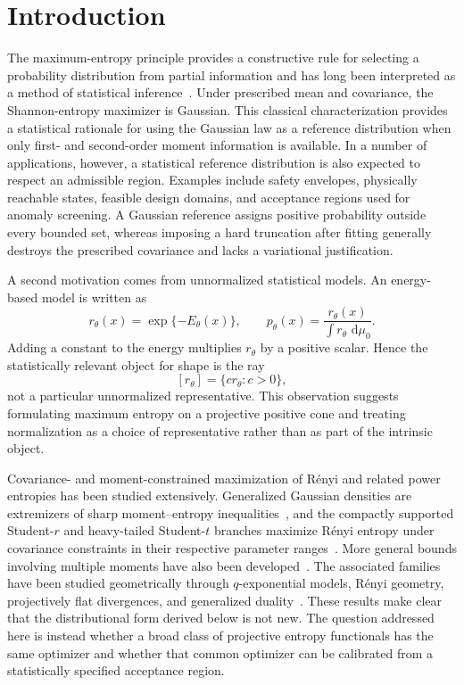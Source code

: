 \documentclass[pdflatex,sn-mathphys-num]{sn-jnl}
\theoremstyle{thmstyleone}
\theoremstyle{thmstyletwo}
\theoremstyle{thmstylethree}
\newcommand{\dd}{\,\mathrm{d}}
\begin{document}
\section{Introduction}\label{sec:introduction}

The maximum-entropy principle provides a constructive rule for selecting a probability distribution from partial information and has long been interpreted as a method of statistical inference~\citep{Jaynes1957}. Under prescribed mean and covariance, the Shannon-entropy maximizer is Gaussian. This classical characterization provides a statistical rationale for using the Gaussian law as a reference distribution when only first- and second-order moment information is available. In a number of applications, however, a statistical reference distribution is also expected to respect an admissible region. Examples include safety envelopes, physically reachable states, feasible design domains, and acceptance regions used for anomaly screening. A Gaussian reference assigns positive probability outside every bounded set, whereas imposing a hard truncation after fitting generally destroys the prescribed covariance and lacks a variational justification.

A second motivation comes from unnormalized statistical models. An energy-based model is written as
\[
 r_\theta(x)=\exp\{-E_\theta(x)\},
 \qquad
 p_\theta(x)=\frac{r_\theta(x)}{\int r_\theta\,\dd\mu_0}.
\]
Adding a constant to the energy multiplies $r_\theta$ by a positive scalar. Hence the statistically relevant object for shape is the ray
\[
 [r_\theta]=\{c r_\theta:c>0\},
\]
not a particular unnormalized representative. This observation suggests formulating maximum entropy on a projective positive cone and treating normalization as a choice of representative rather than as part of the intrinsic object.

Covariance- and moment-constrained maximization of R\'enyi and related power entropies has been studied extensively. Generalized Gaussian densities are extremizers of sharp moment--entropy inequalities~\citep{LutwakYangZhang2005}, and the compactly supported Student-$r$ and heavy-tailed Student-$t$ branches maximize R\'enyi entropy under covariance constraints in their respective parameter ranges~\citep{JohnsonVignat2007}. More general bounds involving multiple moments have also been developed~\citep{Reeves2020}. The associated families have been studied geometrically through $q$-exponential models, R\'enyi geometry, projectively flat divergences, and generalized duality~\citep{AmariOhara2011,Wong2018,WongZhang2022,doi:10.1142/9789811296710_0013}. These results make clear that the distributional form derived below is not new. The question addressed here is instead whether a broad class of projective entropy functionals has the same optimizer and whether that common optimizer can be calibrated from a statistically specified acceptance region.
\end{document}
